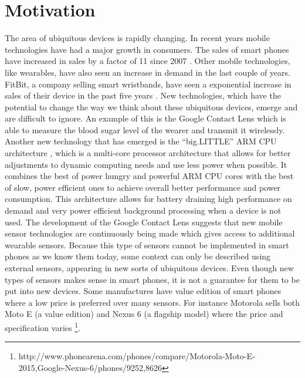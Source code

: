 
\section{Motivation}
\label{sec:motivation}
The area of ubiquitous devices is rapidly changing. In recent years mobile technologies have had a major growth in consumers. The sales of smart phones have increased in sales by a factor of 11 since 2007 \parencite{statsia_smartphones}. Other mobile technologies, like wearables, have also seen an increase in demand in the last couple of years. FitBit, a company selling smart wristbands, have seen a exponential increase in sales of their device in the past five years \parencite{statsia_fitbit}. New technologies, which have the potential to change the way we think about these ubiquitous devices, emerge and are difficult to ignore. An example of this is the Google Contact Lens \parencite{google_contact_lens} which is able to measure the blood sugar level of the wearer and transmit it wirelessly. Another new technology that has emerged is the ``big.LITTLE'' ARM CPU architecture \parencite{big_little_architecture}, which is a multi-core processor architecture that allows for better adjustments to dynamic computing needs and use less power when possible. It combines the best of power hungry and powerful ARM CPU cores with the best of slow, power efficient ones to achieve overall better performance and power consumption. This architecture allows for battery draining high performance on demand and very power efficient background processing when a device is not used. The development of the Google Contact Lens suggests that new mobile sensor technologies are continuously being made which gives access to additional wearable sensors. Because this type of sensors cannot be implemented in smart phones as we know them today, some context can only be described using external sensors, appearing in new sorts of ubiquitous devices. Even though new types of sensors makes sense in smart phones, it is not a guarantee for them to be put into new devices. Some manufactures have value edition of smart phones where a low price is preferred over many sensors. For instance Motorola sells both Moto E (a value edition) and Nexus 6 (a flagship model) where the price and specification varies \footnote{http://www.phonearena.com/phones/compare/Motorola-Moto-E-2015,Google-Nexus-6/phones/9252,8626}.
